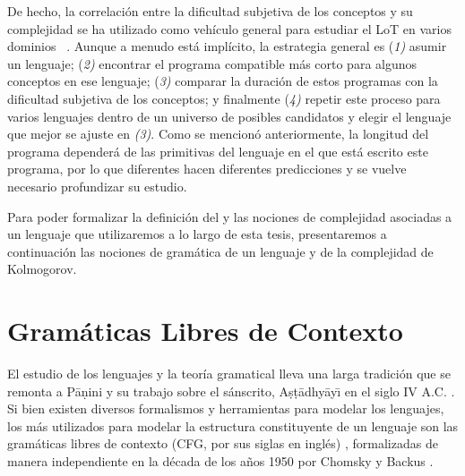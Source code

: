 De hecho, la correlación entre la dificultad subjetiva de los conceptos y su complejidad se ha utilizado como vehículo general para estudiar el LoT  en varios dominios ~\cite{piantadosi2016logical, leeuwenberg1971perceptual, amalric2017language, lupyan2007language}. Aunque a menudo está implícito, la estrategia general es (\textit{1)} asumir un lenguaje; (\textit{2)} encontrar el programa compatible más corto para algunos conceptos en ese lenguaje; (\textit{3)} comparar la duración de estos programas con la dificultad subjetiva de los conceptos; y finalmente (\textit{4)} repetir este proceso para varios lenguajes dentro de un universo de posibles candidatos y elegir el lenguaje que mejor se ajuste en \textit{(3)}. Como se mencionó anteriormente, la longitud del programa dependerá de las primitivas del lenguaje en el que está escrito este programa, por lo que diferentes \lot hacen diferentes predicciones y se vuelve necesario profundizar su estudio.

Para poder formalizar la definición del \lot y las nociones de complejidad asociadas a un lenguaje que utilizaremos a lo largo de esta tesis, presentaremos a continuación las nociones de gramática de un lenguaje y de la complejidad de Kolmogorov.

\section{Gramáticas Libres de Contexto}

El estudio de los lenguajes y la teoría gramatical lleva una larga tradición que se remonta a P{\=a}ṇini y su trabajo sobre el sánscrito, Aṣṭ{\=a}dhy{\=a}y{\=\i}   en el siglo IV A.C. \cite{katre1989}. Si bien existen diversos formalismos y herramientas para modelar los lenguajes, los más utilizados para modelar la estructura constituyente de un lenguaje son las gramáticas libres de contexto (CFG, por sus siglas en inglés) \cite{keselj2009speech}, formalizadas de manera independiente en la década de los años 1950 por Chomsky \cite{chomsky1956three} y Backus \cite{backus1959syntax}.

